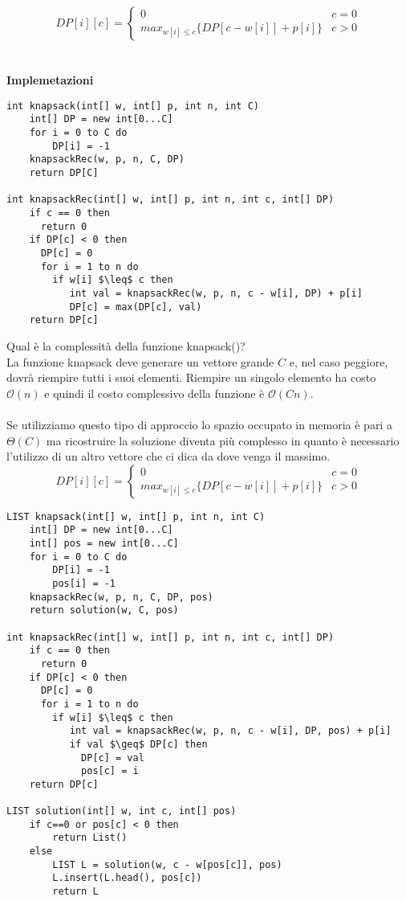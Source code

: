 \documentclass[../cheatSheetAlgoritmi.tex]{subfiles}
\begin{document}
\begin{equation*}
  	DP[i][c] =\begin{cases}
    	0 & \text{$c = 0$}\\
    	max_{w[i] \leq c}\{DP[c-w[i]]+p[i]\} & \text{$c>0$}
  	\end{cases}
\end{equation*}\\\\
\textbf{Implemetazioni}
\begin{lstlisting}[caption= Knapsack zaino senza limiti]
int knapsack(int[] w, int[] p, int n, int C)
	int[] DP = new int[0...C]
	for i = 0 to C do
		DP[i] = -1
	knapsackRec(w, p, n, C, DP)
	return DP[C]
	
int knapsackRec(int[] w, int[] p, int n, int c, int[] DP)
	if c == 0 then
	  return 0
	if DP[c] < 0 then
	  DP[c] = 0
	  for i = 1 to n do
	    if w[i] $\leq$ c then
	  	   int val = knapsackRec(w, p, n, c - w[i], DP) + p[i]
	   	   DP[c] = max(DP[c], val)
	return DP[c]
\end{lstlisting}
Qual è la complessità della funzione knapsack()?\\
La funzione knapsack deve generare un vettore grande $C$ e, nel caso peggiore, dovrà riempire tutti i suoi elementi. Riempire un singolo elemento ha costo $\mathcal{O}(n)$ e quindi il costo complessivo della funzione è  $\mathcal{O}(Cn)$.\\\\
Se utilizziamo questo tipo di approccio lo spazio occupato in memoria è pari a $\Theta(C)$ ma ricostruire la soluzione diventa più complesso in quanto è necessario l'utilizzo di un altro vettore che ci dica da dove venga il massimo.
\begin{equation*}
  	DP[i][c] =\begin{cases}
    	0 & \text{$c = 0$}\\
    	max_{w[i] \leq c}\{DP[c-w[i]]+p[i]\} & \text{$c>0$}
  	\end{cases}
\end{equation*}
\begin{lstlisting}[caption= Knapsack Ricostruzione Soluzione]
LIST knapsack(int[] w, int[] p, int n, int C)
	int[] DP = new int[0...C]
	int[] pos = new int[0...C]
	for i = 0 to C do
		DP[i] = -1
		pos[i] = -1
	knapsackRec(w, p, n, C, DP, pos)
	return solution(w, C, pos)
	
int knapsackRec(int[] w, int[] p, int n, int c, int[] DP)
	if c == 0 then
	  return 0
	if DP[c] < 0 then
	  DP[c] = 0
	  for i = 1 to n do
	    if w[i] $\leq$ c then
	  	   int val = knapsackRec(w, p, n, c - w[i], DP, pos) + p[i]
	  	   if val $\geq$ DP[c] then
	   	     DP[c] = val
	   	     pos[c] = i
	return DP[c]
	
LIST solution(int[] w, int c, int[] pos)
	if c==0 or pos[c] < 0 then
		return List()
	else
		LIST L = solution(w, c - w[pos[c]], pos)
		L.insert(L.head(), pos[c])
		return L
\end{lstlisting}
\end{document}
